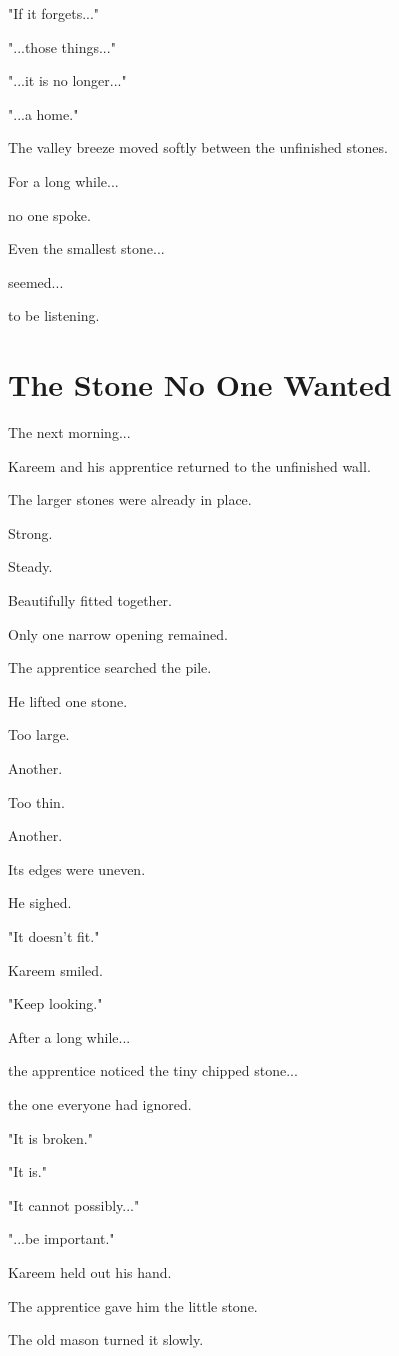 \documentclass[12pt,openany]{book}
\begin{document}
"If it forgets..."

"...those things..."

"...it is no longer..."

"...a home."

The valley breeze moved softly between the unfinished stones.

For a long while...

no one spoke.

Even the smallest stone...

seemed...

to be listening.
\section*{The Stone No One Wanted}

The next morning...

Kareem and his apprentice returned to the unfinished wall.

The larger stones were already in place.

Strong.

Steady.

Beautifully fitted together.

Only one narrow opening remained.

The apprentice searched the pile.

He lifted one stone.

Too large.

Another.

Too thin.

Another.

Its edges were uneven.

He sighed.

"It doesn't fit."

Kareem smiled.

"Keep looking."

After a long while...

the apprentice noticed the tiny chipped stone...

the one everyone had ignored.

"It is broken."

"It is."

"It cannot possibly..."

"...be important."

Kareem held out his hand.

The apprentice gave him the little stone.

The old mason turned it slowly.
\end{document}
